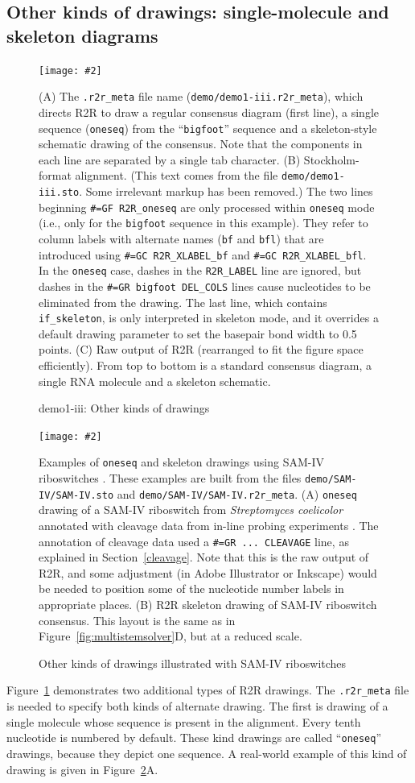 \documentclass[letterpaper,12pt]{report}
\newcommand{\indexconcept}[1]{\index{R2R commands!#1}}
\newcommand{\fig}[4]{
\begin{figure}
\texttt{[image: \#2]}
\caption{#3}

\begin{small}
#4
\end{small}
\label{#1}
\end{figure}
}
\begin{document}
\subsection{Other kinds of drawings: single-molecule and skeleton diagrams}
\fig{fig:demo1iii}{figures/demo-iii.pdf}{demo1-iii: Other kinds of drawings}{
(A)
The {\tt .r2r\_meta} file name ({\tt demo/demo1-iii.r2r\_meta}),
which directs R2R to draw a regular consensus diagram (first line),
a single sequence ({\tt oneseq}) from the ``{\tt bigfoot}'' sequence
and a skeleton-style schematic drawing of the consensus.
Note that the components in each line are separated by a single tab character.
(B)
Stockholm-format alignment.
(This text comes from the file {\tt demo/demo1-iii.sto}.  Some irrelevant markup has been removed.)
The two lines beginning {\tt \#=GF R2R\_oneseq} are only processed within {\tt oneseq} mode (i.e., only for the {\tt bigfoot} sequence in this example).
They refer to column labels with alternate names ({\tt bf} and {\tt bfl}) that
are introduced using {\tt \#=GC R2R\_XLABEL\_bf} and {\tt \#=GC R2R\_XLABEL\_bfl}.
In the {\tt oneseq} case, dashes in the {\tt R2R\_LABEL} line are ignored,
but dashes in the {\tt \#=GR bigfoot DEL\_COLS} lines cause nucleotides to be
eliminated from the drawing.
The last line, which contains {\tt if\_skeleton}, is only interpreted
in skeleton mode, and it overrides a default drawing parameter to set the
basepair bond width to 0.5 points.
(C)
Raw output of R2R (rearranged to fit the figure space efficiently).
From top to bottom is a standard consensus diagram,
a single RNA molecule and a skeleton schematic.
}
\fig{fig:SAMIValternate}{figures/demo-SAM-IV-alternate.pdf}{Other kinds of drawings illustrated with SAM-IV riboswitches}{
Examples of {\tt oneseq} and skeleton drawings using SAM-IV riboswitches \cite{SAMIV}.
These examples are built from the files {\tt demo/SAM-IV/SAM-IV.sto} and {\tt demo/SAM-IV/SAM-IV.r2r\_meta}.
(A) {\tt oneseq} drawing of a SAM-IV riboswitch from
{\it Streptomyces coelicolor} annotated with cleavage data from
in-line probing experiments \cite{SAMIV}.
The annotation of cleavage data used a {\tt \#=GR ... CLEAVAGE} line, as
explained in Section~\ref{cleavage}.
Note that this is the raw output of R2R, and some adjustment
(in Adobe Illustrator or Inkscape) would be needed to position some of the nucleotide
number labels in appropriate places.
(B) R2R skeleton drawing of SAM-IV riboswitch consensus.
This layout is the same as in Figure~\ref{fig:multistemsolver}D, but at a reduced scale.
}

\indexconcept{Single RNA molecule drawing}
Figure~\ref{fig:demo1iii} demonstrates two additional types of R2R drawings.
The {\tt .r2r\_meta} file is needed to specify both kinds of alternate drawing.
The first is drawing of a single molecule whose sequence is present in the alignment.
Every tenth nucleotide is numbered by default.
These kind drawings are called ``{\tt oneseq}'' drawings, because they depict one sequence.
A real-world example of this kind of drawing is given in Figure~\ref{fig:SAMIValternate}A.
\end{document}
